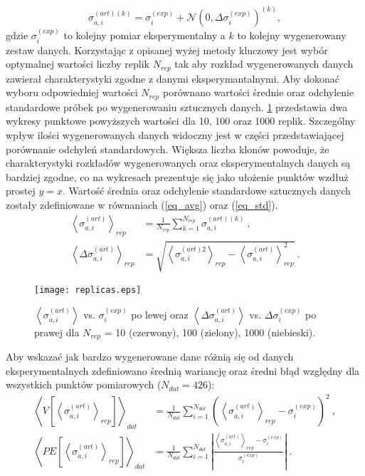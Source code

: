 \documentclass[11pt]{book}
\theoremstyle{definition}
\begin{document}
%
\begin{equation}
\sigma^{(art)(k)}_{a,i} = \sigma_i^{(exp)} + \mathcal{N}\left( 0, \Delta \sigma_i^{(exp)} \right)^{(k)},
\end{equation} 
gdzie $\sigma_i^{(exp)}$ to kolejny pomiar eksperymentalny a $k$ to kolejny wygenerowany zestaw danych. Korzystając z opisanej wyżej metody kluczowy jest wybór optymalnej wartości liczby replik $N_{rep}$ tak aby rozkład wygenerowanych danych zawierał charakterystyki zgodne z danymi eksperymantalnymi. Aby dokonać wyboru odpowiedniej wartości $N_{rep}$ porównano wartości średnie oraz odchylenie standardowe próbek po wygenerowaniu sztucznych danych. \figurename{} \ref{fig:repliki} przedstawia dwa wykresy punktowe powyższych wartości dla 10, 100 oraz 1000 replik. Szczególny wpływ ilości wygenerowanych danych widoczny jest w części przedstawiającej porównanie odchyleń standardowych. Większa liczba klonów powoduje, że charakterystyki rozkładów wygenerowanych oraz eksperymentalnych danych są bardziej zgodne, co na wykresach prezentuje się jako ułożenie punktów wzdłuż prostej $y=x$. Wartość średnia oraz odchylenie standardowe sztucznych danych zostały zdefiniowane w równaniach (\ref{eq_avg}) oraz (\ref{eq_std}).
%
\begin{subequations}
	\begin{align}
	\left \langle \sigma_{a,i}^{(art)} \right \rangle_{rep} &= \frac{1}{N_{rep}} \sum_{k=1}^{N_{rep}} \sigma_{a,i}^{(art)(k)}~,
	\label{eq_avg} \\
	\left \langle \Delta \sigma_{a,i}^{(art)} \right \rangle_{rep} &= \sqrt{\left \langle \sigma_{a,i}^{(art)2} \right\rangle_{rep} - \left\langle \sigma_{a,i}^{(art)} \right\rangle^2_{rep} }~.
	\label{eq_std}
	\end{align}
\end{subequations}
%
\begin{figure}[htp!]
	\centering
	\texttt{[image: replicas.eps]}
	\caption{$\left \langle \sigma_{a,i}^{(art)} \right\rangle$ vs. $\sigma_i^{(exp)}$ po lewej oraz $\left \langle \Delta \sigma_{a,i}^{(art)} \right \rangle$ vs. $\Delta \sigma_i^{(exp)}$ po prawej dla $N_{rep}$ = 10 (czerwony), 100 (zielony), 1000 (niebieski).} 
	\label{fig:repliki}
\end{figure}
%
Aby wskazać jak bardzo wygenerowane dane różnią się od danych eksperymentalnych zdefiniowano średnią wariancję oraz średni błąd względny dla wszystkich punktów pomiarowych ($N_{dat} = 426$):
\begin{subequations}
	\begin{align}
	\left \langle V	\left[ \left \langle \sigma_{a,i}^{(art)} \right \rangle_{rep} \right] \right \rangle_{dat} &= \frac{1}{N_{dat}} \sum_{i=1}^{N_{dat}} \left( \left\langle \sigma_{a,i}^{(art)} \right\rangle_{rep} - \sigma_i^{(exp)}  \right)^2 ~,
	\label{eq_var} \\
	\left \langle PE	\left[ \left \langle \sigma_{a,i}^{(art)} \right \rangle_{rep} \right] \right \rangle_{dat} &= \frac{1}{N_{dat}} \sum_{i=1}^{N_{dat}} \left| \frac{\left\langle \sigma_{a,i}^{(art)} \right\rangle_{rep} - \sigma_i^{(exp)}}{\sigma_i^{(exp)}}  \right| ~.
	\label{eq_pe}
	\end{align}
\end{subequations}
\end{document}

